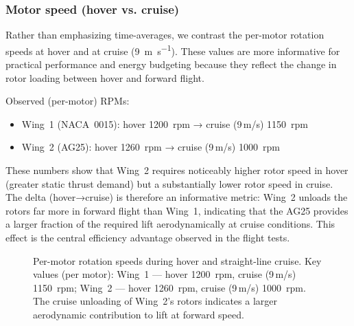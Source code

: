 \subsubsection{Motor speed (hover vs. cruise)}

Rather than emphasizing time-averages, we contrast the per-motor rotation speeds at hover and at cruise (\SI{9}{\meter\per\second}). These values are more informative for practical performance and energy budgeting because they reflect the change in rotor loading between hover and forward flight.

Observed (per-motor) RPMs:
\begin{itemize}
  \item Wing~1 (NACA~0015): hover \SI{1200}{rpm} → cruise (9\,m/s) \SI{1150}{rpm}
  \item Wing~2 (AG25):      hover \SI{1260}{rpm} → cruise (9\,m/s) \SI{1000}{rpm}
\end{itemize}

These numbers show that Wing~2 requires noticeably higher rotor speed in hover (greater static thrust demand) but a substantially lower rotor speed in cruise. The delta (hover→cruise) is therefore an informative metric: Wing~2 unloads the rotors far more in forward flight than Wing~1, indicating that the AG25 provides a larger fraction of the required lift aerodynamically at cruise conditions. This effect is the central efficiency advantage observed in the flight tests.

\begin{figure}[htbp]
  \centering
  \caption{Per-motor rotation speeds during hover and straight-line cruise. Key values (per motor): Wing~1 — hover \SI{1200}{rpm}, cruise (9\,m/s) \SI{1150}{rpm}; Wing~2 — hover \SI{1260}{rpm}, cruise (9\,m/s) \SI{1000}{rpm}. The cruise unloading of Wing~2's rotors indicates a larger aerodynamic contribution to lift at forward speed.}
  \label{fig:wing_comparison_motor_speeds}
\end{figure}

